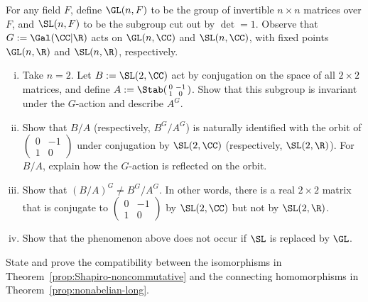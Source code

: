 \begin{Exercises}
	\item For any field $F$, define $\GL(n,F)$ to be the group of invertible
	$n\times n$ matrices over $F$, and $\SL(n,F)$ to be the subgroup cut out
	by $\det=1$. Observe that $G:=\Gal(\CC|\R)$ acts on $\GL(n,\CC)$ and
	$\SL(n,\CC)$, with fixed points $\GL(n,\R)$ and $\SL(n,\R)$,
	respectively.
	\begin{enumerate}[(i)]
		\item Take $n=2$. Let $B:=\SL(2,\CC)$ act by conjugation on the space
		of all $2\times2$ matrices, and define
		$A:=\Stab(\begin{smallmatrix}0&-1\\1&0\end{smallmatrix})$. Show that
		this subgroup is invariant under the $G$-action and describe $A^G$.
		\item Show that $B/A$ (respectively, $B^G/A^G$) is naturally
		identified with the orbit of
		$\left(\begin{smallmatrix}0&-1\\1&0\end{smallmatrix}\right)$ under
		conjugation by $\SL(2,\CC)$ (respectively, $\SL(2,\R)$). For $B/A$,
		explain how the $G$-action is reflected on the orbit.
		\item Show that $(B/A)^G\neq B^G/A^G$. In other words, there is a
		real $2\times2$ matrix that is conjugate to
		$\left(\begin{smallmatrix}0&-1\\1&0\end{smallmatrix}\right)$ by
		$\SL(2,\CC)$ but not by $\SL(2,\R)$.
		\item Show that the phenomenon above does not occur if $\SL$ is
		replaced by $\GL$.
	\end{enumerate}

	\item State and prove the compatibility between the isomorphisms in
	Theorem~\ref{prop:Shapiro-noncommutative} and the connecting
	homomorphisms in Theorem~\ref{prop:nonabelian-long}.


\end{Exercises}
